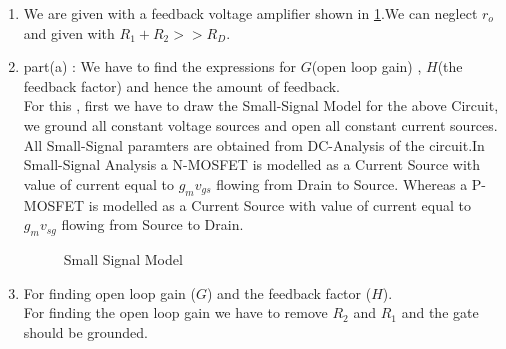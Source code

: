 \begin{enumerate}[label=\arabic*.,ref=\theenumi]

\item We are given with a feedback voltage amplifier shown in \ref{fig:Voltage feedback amplifier}.We can neglect $r_{o}$ and given with $R_{1}+R_{2}>>R_{D}$.\\
\begin{figure}[h!]
	\begin{center}
		\resizebox{\columnwidth/1}{!}{}
	\end{center}
	\caption{}
	\label{fig:Voltage feedback amplifier}
\end{figure}

\item part(a) : We have to find the expressions for $G$(open loop gain) , $H$(the feedback factor) and hence the amount of feedback.\\

\solution
For this , first we have to draw the Small-Signal Model for the above Circuit, we ground all constant voltage sources and open all constant current sources. All Small-Signal paramters are obtained from DC-Analysis of the circuit.In Small-Signal Analysis a N-MOSFET is modelled as a Current Source with value of current equal to $g_{m}v_{gs}$ flowing from Drain to Source. Whereas a P-MOSFET is modelled as a Current Source with value of current equal to $g_{m}v_{sg}$ flowing from Source to Drain.

\begin{figure}[h!]
	\begin{center}
		\resizebox{\columnwidth/1}{!}{}
	\end{center}
	\caption{Small Signal Model}
	\label{fig:Small_Signal}
\end{figure}


\item For finding open loop gain ($G$) and the feedback factor ($H$).\\
\solution 
For finding the open loop gain we have to remove $R_{2}$ and $R_{1}$  and the gate should be grounded.


\end{enumerate}
